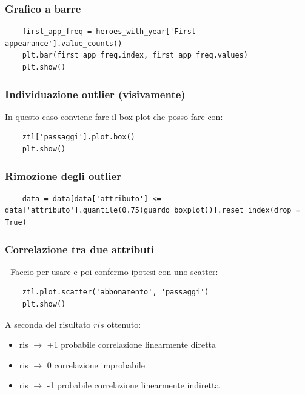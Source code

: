 \documentclass{article}
\begin{document}
\subsubsection*{Grafico a barre}
\begin{lstlisting}
    first_app_freq = heroes_with_year['First appearance'].value_counts()
    plt.bar(first_app_freq.index, first_app_freq.values)
    plt.show()
\end{lstlisting}

\subsubsection*{Individuazione outlier (visivamente)}

In questo caso conviene fare il box plot che posso fare con:

\begin{lstlisting}
    ztl['passaggi'].plot.box()
    plt.show()
\end{lstlisting}

\subsubsection*{Rimozione degli outlier}

\begin{lstlisting}
    data = data[data['attributo'] <= data['attributo'].quantile(0.75(guardo boxplot))].reset_index(drop = True)
\end{lstlisting}

\subsubsection*{Correlazione tra due attributi}

- Faccio  per usare  e poi confermo ipotesi con uno scatter:

\begin{lstlisting}
    ztl.plot.scatter('abbonamento', 'passaggi')
    plt.show()
\end{lstlisting}

A seconda del risultato $ris$ ottenuto:

\begin{itemize}
    \item ris $\to$ +1 probabile correlazione linearmente diretta
    \item ris $\to$ 0 correlazione improbabile
    \item ris $\to$ -1 probabile correlazione linearmente indiretta
\end{itemize}
\end{document}

